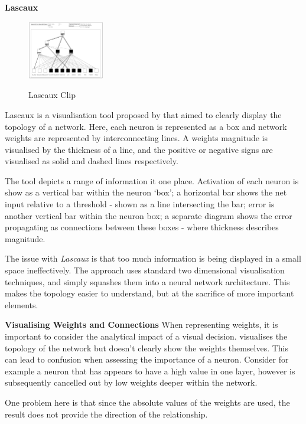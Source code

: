 \documentclass[a4paper,11pt,titlepage]{article}
\begin{document}
\textbf{Lascaux}
		
	\begin{figure}[H]
    			\centering	
			{{\includegraphics[width=0.3\textwidth]
    				{img/craven_weights.png} 
    			}}%
    			\caption{Lascaux Clip}%
    		\label{fig:lascaux}
	\end{figure}  		
 		
		Lascaux is a visualisation tool proposed by \cite{Craven1992} that aimed to clearly display the topology of a network. Here, each neuron is represented as a box and network weights are represented by interconnecting lines. A weights magnitude is visualised by the thickness of a line, and the positive or negative signs are visualised as solid and dashed lines respectively.
		\par 
		The tool depicts a range of information it one place. Activation of each neuron is show as a vertical bar within the neuron `box'; a horizontal bar shows the net input relative to a threshold - shown as a line intersecting the bar; error is another vertical bar within the neuron box; a separate diagram shows the error propagating as connections between these boxes - where thickness describes magnitude.
		\par 
		The issue with \textit{Lascaux} is that too much information is being displayed in a small space ineffectively. The approach uses standard two dimensional visualisation techniques, and simply squashes them into a neural network architecture. This makes the topology easier to understand, but at the sacrifice of more important elements.

\textbf{Visualising Weights and Connections}
		When representing weights, it is important to consider the analytical impact of a visual decision. \cite{Streeter2001} visualises the topology of the network but doesn't clearly show the weights themselves. This can lead to confusion when assessing the importance of a neuron. Consider for example a neuron that has appears to have a high value in one layer, however is subsequently cancelled out by low weights deeper within the network.
	\par 
	One problem here is that since the absolute values of the weights are used, the result does not provide the direction of the relationship. 
	\par 
		
\end{document}
